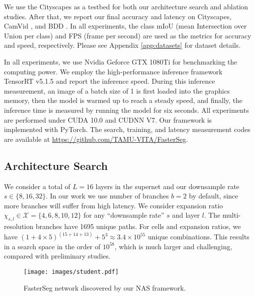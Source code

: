 \documentclass{article} \usepackage{iclr2020_conference,times}
\begin{document}
We use the Cityscapes \citep{cordts2016cityscapes} as a testbed for both our architecture search and ablation studies. After that, we report our final accuracy and latency on Cityscapes, CamVid \citep{brostow2008segmentation}, and BDD \citep{yu2018bdd100k}. In all experiments, the class mIoU (mean Intersection over Union per class) and FPS (frame per second) are used as the metrics for accuracy and speed, respectively. Please see Appendix \ref{app:datasets} for dataset details.

In all experiments, we use Nvidia Geforce GTX 1080Ti for benchmarking the computing power. We employ the high-performance inference framework TensorRT v5.1.5 and report the inference speed. During this inference measurement, an image of a batch size of 1 is first loaded into the graphics memory, then the model is warmed up to reach a steady speed, and finally, the inference time is measured by running the model for six seconds. All experiments are performed under CUDA 10.0 and CUDNN V7. Our framework is implemented with PyTorch. The search, training, and latency measurement codes are available at \url{https://github.com/TAMU-VITA/FasterSeg}.\vspace{-0.5em}

\subsection{Architecture Search}\vspace{-0.5em}

We consider a total of $L = 16$ layers in the supernet and our downsample rate $s \in \{8, 16, 32\}$. In our work we use number of branches $b = 2$ by default, since more branches will suffer from high latency. We consider expansion ratio $\chi_{s,l} \in \mathcal{X} = \{4, 6, 8, 10, 12\}$ for any ``downsample rate'' $s$ and layer $l$. The multi-resolution branches have 1695 unique paths. For cells and expansion ratios, we have $(1+4\times5)^{(15+14+13)}+5^3 \approx 3.4\times10^{55}$ unique combinations. This results in a search space in the order of $10^{58}$, which is much larger and challenging, compared with preliminary studies.

\begin{wrapfigure}{r}{82mm}
\vspace{-1.5em}
\begin{center}
\texttt{[image: images/student.pdf]}
\end{center}
\vspace{-1em}
\caption{FasterSeg network discovered by our NAS framework.}
\vspace{-1em}
\label{fig:student_arch}
\end{wrapfigure}
\end{document}
